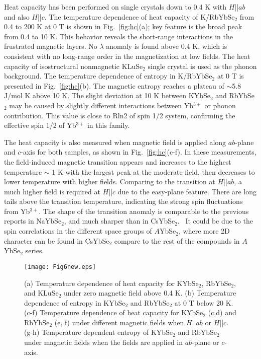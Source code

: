 \documentclass[%
 aip,
 amsmath,amssymb,
 reprint,%
]{revtex4-1}
\begin{document}
Heat capacity has been performed on single crystals down to 0.4 K with $H$||$ab$ and also $H$||$c$. The temperature dependence of heat capacity of K/RbYbSe$_2$ from 0.4 to 200 K at 0 T is shown in Fig.~\ref{fig:hc}(a); key feature is the broad peak from 0.4 to 10 K. This behavior reveals the short-range interactions in the frustrated magnetic layers. No $\lambda$ anomaly is found above 0.4 K, which is consistent with no long-range order in the magnetization at low fields. The heat capacity of isostructural nonmagnetic KLuSe$_2$ single crystal is used as the phonon background. The temperature dependence of entropy in K/RbYbSe$_2$ at 0 T is presented in Fig.~\ref{fig:hc}(b). The magnetic entropy reaches a plateau of $\sim$5.8 J/mol K above 10 K. The slight deviation at 10 K between KYbSe$_2$ and RbYbSe$_2$ may be caused by slightly different interactions between Yb$^{3+}$ or phonon contribution. This value is close to Rln2 of spin 1/2 system, confirming the effective spin 1/2 of Yb$^{3+}$ in this family. 

The heat capacity is also measured when magnetic field is applied along $ab$-plane and $c$-axis for both samples, as shown in Fig.~\ref{fig:hc}(c-f). In these measurements, the field-induced magnetic transition appears and increases to the highest temperature $\sim$ 1 K with the largest peak at the moderate field, then decreases to lower temperature with higher fields. Comparing to the transition at $H$||$ab$, a much higher field is required at $H$||$c$ due to the easy-plane feature. There are long tails above the transition temperature, indicating the strong spin fluctuations from Yb$^{3+}$. The shape of the transition anomaly is comparable to the previous reports in NaYbSe$_2$, and much sharper than in CsYbSe$_2$.~\cite{Ranjith2019naybse,PhysRevB.100.220407} It could be due to the spin correlations in the different space groups of $A$YbSe$_2$, where more 2D character can be found in CsYbSe$_2$ compare to the rest of the compounds in $A$YbSe$_2$ series.

\begin{figure}[tbh]
\texttt{[image: Fig6new.eps]}
\caption {\label{fig:hc}(a) Temperature dependence of heat capacity for KYbSe$_2$, RbYbSe$_2$, and KLuSe$_2$ under zero magnetic field above 0.4 K. (b) Temperature dependence of entropy in KYbSe$_2$ and RbYbSe$_2$ at 0 T below 20 K. (c-f) Temperature dependence of heat capacity for KYbSe$_2$ (c,d) and RbYbSe$_2$ (e, f) under different magnetic fields when $H$||$ab$ or $H$||$c$. (g-h) Temperature dependent entropy of KYbSe$_2$ and RbYbSe$_2$ under magnetic fields when the fields are applied in $ab$-plane or $c$-axis. }
\label{crystal}
\end{figure}
\end{document}
